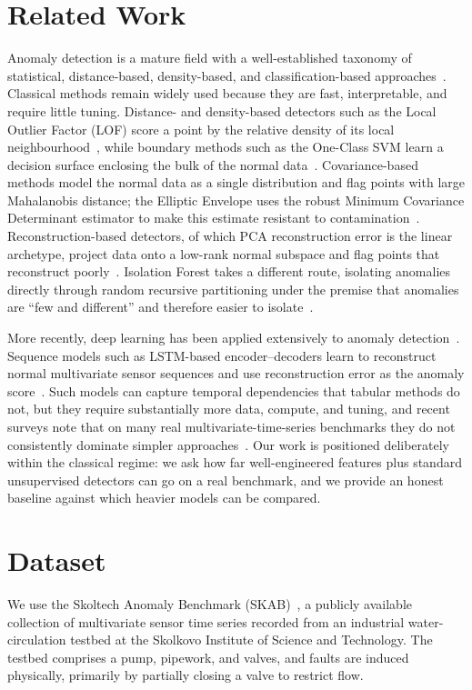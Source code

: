 \documentclass[conference]{IEEEtran}
\begin{document}
\section{Related Work}
\label{sec:related}
Anomaly detection is a mature field with a well-established taxonomy of
statistical, distance-based, density-based, and classification-based
approaches~\cite{chandola2009}. Classical methods remain widely used because
they are fast, interpretable, and require little tuning. Distance- and
density-based detectors such as the Local Outlier Factor (LOF) score a point by
the relative density of its local neighbourhood~\cite{breunig2000}, while
boundary methods such as the One-Class SVM learn a decision surface enclosing
the bulk of the normal data~\cite{scholkopf2001}. Covariance-based methods
model the normal data as a single distribution and flag points with large
Mahalanobis distance; the Elliptic Envelope uses the robust Minimum Covariance
Determinant estimator to make this estimate resistant to
contamination~\cite{rousseeuw1999}. Reconstruction-based detectors, of which PCA
reconstruction error is the linear archetype, project data onto a low-rank
normal subspace and flag points that reconstruct poorly~\cite{shyu2003}.
Isolation Forest takes a different route, isolating anomalies directly through
random recursive partitioning under the premise that anomalies are ``few and
different'' and therefore easier to isolate~\cite{liu2008}.

More recently, deep learning has been applied extensively to anomaly
detection~\cite{chalapathy2019}. Sequence models such as LSTM-based
encoder--decoders learn to reconstruct normal multivariate sensor sequences and
use reconstruction error as the anomaly score~\cite{malhotra2016}. Such models
can capture temporal dependencies that tabular methods do not, but they require
substantially more data, compute, and tuning, and recent surveys note that on
many real multivariate-time-series benchmarks they do not consistently dominate
simpler approaches~\cite{belay2023}. Our work is positioned deliberately within
the classical regime: we ask how far well-engineered features plus standard
unsupervised detectors can go on a real benchmark, and we provide an honest
baseline against which heavier models can be compared.

\section{Dataset}
\label{sec:dataset}
We use the Skoltech Anomaly Benchmark (SKAB)~\cite{skab2020}, a publicly
available collection of multivariate sensor time series recorded from an
industrial water-circulation testbed at the Skolkovo Institute of Science and
Technology. The testbed comprises a pump, pipework, and valves, and faults are
induced physically, primarily by partially closing a valve to restrict flow.
\end{document}
